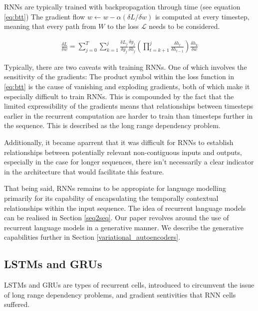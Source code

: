\documentclass[12pt,twoside]{report}
\begin{document}
RNNs are typically trained with backpropagation through time (see equation \ref{eq:btt}) The gradient flow $w \leftarrow w - \alpha ({\delta L}/{\delta w})$ is computed at every timestep, meaning that every path from $W$ to the loss $\mathcal{L}$ needs to be considered.

\begin{equation}
\label{eq:btt}
\begin{aligned}
	\frac{\delta L}{\delta w} = \sum^T_{j=0}\sum^j_{k=1}\frac{\delta L_j}{\delta y_j}\frac{\delta y_j}{\delta h_j}(\prod^j_{t=k+1}\frac{\delta h_t}{\delta h_{t-1}})\frac{\delta h_k}{\delta w}
\end{aligned}
\end{equation}

Typically, there are two caveats with training RNNs. One of which involves the sensitivity of the gradients: The product symbol within the loss function in \ref{eq:btt} is the cause of vanishing and exploding gradients, both of which make it especially difficult to train RNNs. This is compounded by the fact that the limited expressibility of the gradients means that relationships between timesteps earlier in the recurrent computation are harder to train than timesteps further in the sequence. This is described as the long range dependency problem.

Additionally, it became aparrent that it was difficult for RNNs to establish relationships between potentially relevant non-contiguous inputs and outputs, especially in the case for longer sequences, there isn't necessarily a clear indicator in the architecture that would facilitate this feature. 

That being said, RNNs remains to be appropiate for language modelling primarily for its capability of encapsulating the temporally contextual relationships within the input sequence. The idea of recurrent language models can be realised in Section \ref{seq2seq}. Our paper revolves around the use of recurrent language models in a generative manner. We describe the generative capabilities further in Section \ref{variational_autoencoders}.

\subsection{LSTMs and GRUs} 

LSTMs and GRUs are types of recurrent cells, introduced to circumvent the issue of long range dependency problems, and gradient sentivities that RNN cells suffered.
\end{document}
